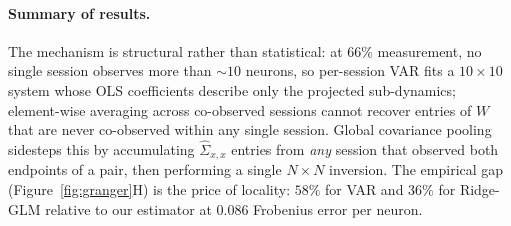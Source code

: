 \documentclass{article}
\begin{document}
\paragraph{Summary of results.}
The mechanism is structural rather than statistical: at $66\%$ measurement, no single session observes more than ${\sim}10$ neurons, so per-session VAR fits a $10{\times}10$ system whose OLS coefficients describe only the projected sub-dynamics; element-wise averaging across co-observed sessions cannot recover entries of $W$ that are never co-observed within any single session. Global covariance pooling sidesteps this by accumulating $\hat{\Sigma}_{x,x}$ entries from \emph{any} session that observed both endpoints of a pair, then performing a single $N{\times}N$ inversion. The empirical gap (Figure~\ref{fig:granger}H) is the price of locality: $58\%$ for VAR and $36\%$ for Ridge-GLM relative to our estimator at $0.086$ Frobenius error per neuron.
\end{document}
